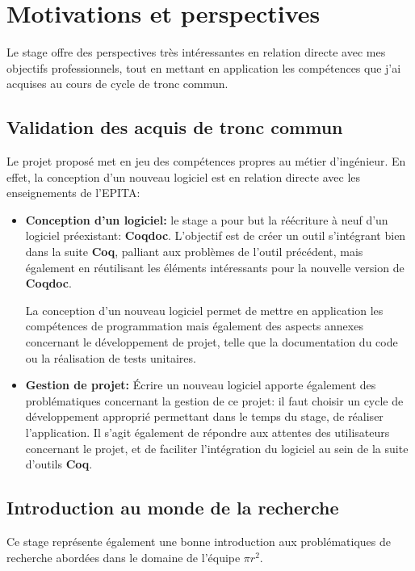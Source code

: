 \documentclass[a4paper, 11pt]{report}
\newcommand{\pir}[0]{\textbf{$\pi r^2$}\xspace}
\newcommand{\coq}[0]{\textbf{Coq}\xspace}
\newcommand{\coqdoc}[0]{\textbf{Coqdoc}\xspace}
\newcommand{\epita}[0]{EPITA}
\begin{document}
  \section{Motivations et perspectives}
  Le stage offre des perspectives très intéressantes en relation directe
  avec mes objectifs professionnels, tout en mettant en application les
  compétences que j'ai acquises au cours de cycle de tronc commun.

  \subsection{Validation des acquis de tronc commun}
  Le projet proposé met en jeu des compétences propres au métier d'ingénieur.
  En effet, la conception d'un nouveau logiciel est en relation directe
  avec les enseignements de l'\epita:
  \begin{itemize}
    \item \textbf{Conception d'un logiciel:} le stage a pour but la réécriture à
      neuf d'un logiciel préexistant: \coqdoc. L'objectif est de créer un outil
      s'intégrant bien dans la suite \coq, palliant aux problèmes de l'outil
      précédent, mais également en réutilisant les éléments intéressants pour
      la nouvelle version de \coqdoc.

      La conception d'un nouveau logiciel permet de mettre en application
      les compétences de programmation mais également des aspects
      annexes concernant le développement de projet, telle que
      la documentation du code ou la réalisation de tests unitaires.
    \item \textbf{Gestion de projet:} Écrire un nouveau logiciel
      apporte également des problématiques concernant la gestion de
      ce projet: il faut choisir un cycle de développement
      approprié permettant dans le temps du stage, de réaliser
      l'application. Il s'agit également de répondre aux attentes
      des utilisateurs concernant le projet, et de faciliter l'intégration
      du logiciel au sein de la suite d'outils \coq.
  \end{itemize}

  \subsection{Introduction au monde de la recherche}
  Ce stage représente également une bonne introduction aux problématiques
  de recherche abordées dans le domaine de l'équipe \pir.
\end{document}

